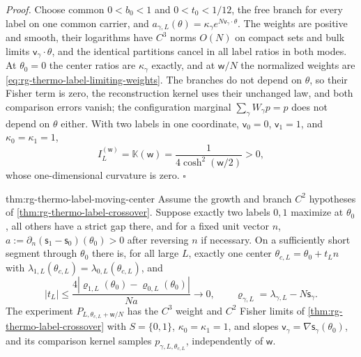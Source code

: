 \noindent\emph{Proof.}
Choose common $0<b_0<1$ and $0<t_0<1/12$, the free branch for every label on
one common carrier, and
$a_{\gamma,L}(\theta)=\kappa_\gamma e^{N\mathsf v_\gamma\cdot\theta}$. The
weights are positive and smooth, their logarithms have $C^3$ norms $O(N)$ on
compact sets and bulk limits $\mathsf v_\gamma\cdot\theta$, and the identical
partitions cancel in all label ratios in both modes. At $\theta_0=0$ the center
ratios are $\kappa_\gamma$ exactly, and at $\mathsf w/N$ the normalized weights
are \cref{eq:rg-thermo-label-limiting-weights}. The branches do not depend on
$\theta$, so their Fisher term is zero, the reconstruction kernel uses their
unchanged law, and both comparison errors vanish; the configuration marginal
$\sum_\gamma W_\gamma p=p$ does not depend on $\theta$ either. With two labels
in one coordinate, $\mathsf v_0=0$, $\mathsf v_1=1$, and
$\kappa_0=\kappa_1=1$,
\begin{equation}
 I_L^{(\mathsf w)}=\mathbb K(\mathsf w)=\frac1{4\cosh^2(\mathsf w/2)}>0,
 \label{eq:rg-thermo-label-binary-native-window}
\end{equation}
whose one-dimensional curvature is zero. $\square$

{thm:rg-thermo-label-moving-center}
Assume the growth and branch $C^2$ hypotheses of
\cref{thm:rg-thermo-label-crossover}. Suppose exactly two labels $0,1$
maximize at $\theta_0$, all others have a strict gap there, and for a fixed
unit vector $n$, $a:=\partial_n(\mathsf s_1-\mathsf s_0)(\theta_0)>0$ after
reversing $n$ if necessary. On a sufficiently short segment through
$\theta_0$ there is, for all large $L$, exactly one center
$\theta_{c,L}=\theta_0+t_Ln$ with
$\lambda_{1,L}(\theta_{c,L})=\lambda_{0,L}(\theta_{c,L})$, and
\begin{equation}
 |t_L|\leq\frac{4|\varrho_{1,L}(\theta_0)-\varrho_{0,L}(\theta_0)|}{Na}
 \longrightarrow0,
 \qquad \varrho_{\gamma,L}=\lambda_{\gamma,L}-N\mathsf s_\gamma.
 \label{eq:rg-thermo-label-moving-center-bound}
\end{equation}
The experiment $P_{L,\theta_{c,L}+\mathsf w/N}$ has the $C^3$ weight and
$C^2$ Fisher limits of \cref{thm:rg-thermo-label-crossover} with $S=\{0,1\}$,
$\kappa_0=\kappa_1=1$, and slopes $\mathsf v_\gamma=\nabla\mathsf s_\gamma(\theta_0)$,
and its comparison kernel samples $p_{\gamma,L,\theta_{c,L}}$, independently
of $\mathsf w$. 

